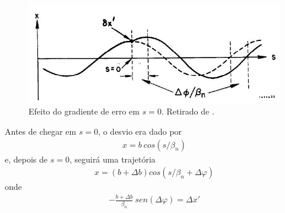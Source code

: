 \begin{figure}[!htb]
	\centering
	\includegraphics[width=0.7\linewidth]{./Figuras/fig23.jpeg}
	\caption{Efeito do gradiente de erro em $s=0$. Retirado de \cite{sands1970physics}.}
	\label{fig:fig23}
\end{figure}

Antes de chegar em $s=0$, o desvio era dado por
\begin{align}
	x = b\ cos(s/\beta_n)
\end{align}
e, depois de $s=0$, seguirá uma trajetória
\begin{align}
	x = (b+\Delta b)cos(s/\beta_n + \Delta \varphi)
\end{align}
onde
\begin{align}
	-\frac{b+\Delta b}{\beta_n}\ sen(\Delta \varphi) = \Delta x'
\end{align}

